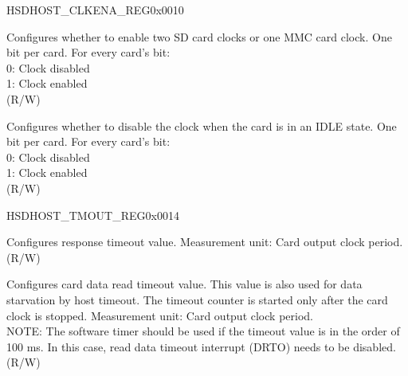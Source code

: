 \begin{register}{H}{SDHOST\_CLKENA\_REG}{0x0010}\label{regdesc:SDHOSTCLKENAREG}
%
%
%
%
\regnewline%
\begin{regdesc}\begin{reglist}
\label{fielddesc:SDHOSTCCLKENABLE}\item [SDHOST\_CCLK\_ENABLE] Configures whether to enable two SD card clocks or one MMC card clock. One bit per card. For every card's bit:\\
0: Clock disabled\\
1: Clock enabled\\(R/W)
\label{fielddesc:SDHOSTLPENABLE}\item [SDHOST\_LP\_ENABLE] Configures whether to disable the clock when the card is in an IDLE state. One bit per card. For every card's bit:\\
0: Clock disabled\\
1: Clock enabled\\(R/W)
\end{reglist}\end{regdesc}
\end{register}


\begin{register}{H}{SDHOST\_TMOUT\_REG}{0x0014}\label{regdesc:SDHOSTTMOUTREG}
%
%
\regnewline%
\begin{regdesc}\begin{reglist}
\label{fielddesc:SDHOSTRESPONSETIMEOUT}\item [SDHOST\_RESPONSE\_TIMEOUT] Configures response timeout value. Measurement unit: Card output clock period. (R/W)
\label{fielddesc:SDHOSTDATATIMEOUT}\item [SDHOST\_DATA\_TIMEOUT] Configures card data read timeout value. This value is also used for data starvation by host timeout. The timeout counter is started only after the card clock is stopped. Measurement unit: Card output clock period.\\
NOTE: The software timer should be used if the timeout value is in the order of 100 ms. In this case, read data timeout interrupt (DRTO) needs to be disabled.\\(R/W)
\end{reglist}\end{regdesc}
\end{register}


